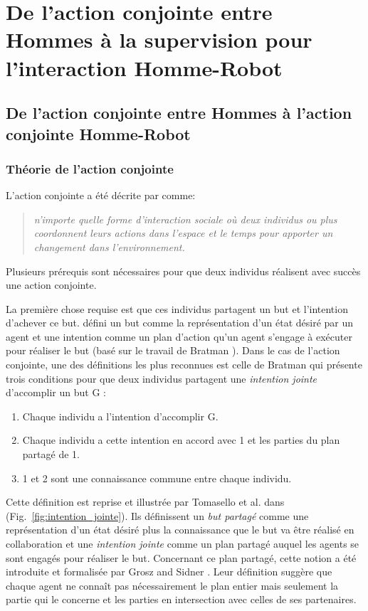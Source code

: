 \documentclass[english,a4paper,11pt,twoside]{StyleThese}
\begin{document}
\section{De l'action conjointe entre Hommes à la supervision pour l'interaction Homme-Robot}

\subsection{De l'action conjointe entre Hommes à l'action conjointe Homme-Robot}


\subsubsection{Théorie de l'action conjointe}

L'action conjointe a été décrite par \cite{sebanz2006joint} comme:

\begin{quote}
\textit{n'importe quelle forme d'interaction sociale où deux individus ou plus coordonnent leurs actions dans l'espace et le temps pour apporter un changement dans l'environnement.}
\end{quote}

Plusieurs prérequis sont nécessaires pour que deux individus réalisent avec succès une action conjointe. 

La première chose requise est que ces individus partagent un but et l'intention d'achever ce but. \cite{tomasello2005understanding} défini un but comme la représentation d'un état désiré par un agent et une intention comme un plan d'action qu'un agent s'engage à exécuter pour réaliser le but (basé sur le travail de Bratman \cite{bratman1989intention}). Dans le cas de l'action conjointe, une des définitions les plus reconnues est celle de Bratman \cite{bratman1993shared} qui présente trois conditions pour que deux individus partagent une \textit{intention jointe} d'accomplir un but G :
\begin{enumerate}
\item Chaque individu a l'intention d'accomplir G.
\item Chaque individu a cette intention en accord avec 1 et les parties du plan partagé de 1.
\item 1 et 2 sont une connaissance commune entre chaque individu.
\end{enumerate}
Cette définition est reprise et illustrée par Tomasello et al. dans \cite{tomasello2005understanding} (Fig.~\ref{fig:intention_jointe}). Ils définissent un \textit{but partagé} comme une représentation d'un état désiré plus la connaissance que le but va être réalisé en collaboration et une \textit{intention jointe} comme un plan partagé auquel les agents se sont engagés pour réaliser le but. Concernant ce plan partagé, cette notion a été introduite et formalisée par Grosz and Sidner \cite{grosz1988plans}. Leur définition suggère que chaque agent ne connaît pas nécessairement le plan entier mais seulement la partie qui le concerne et les parties en intersection avec celles de ses partenaires.
\end{document}
